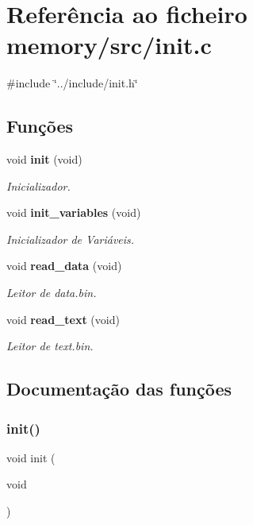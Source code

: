 \section{Referência ao ficheiro memory/src/init.c}
\label{init_8c}
{\ttfamily \#include \char`\"{}../include/init.\+h\char`\"{}}\newline
\subsection*{Funções}
\begin{DoxyCompactItemize}
\item 
void \textbf{ init} (void)
\begin{DoxyCompactList}\small\item\em Inicializador. \end{DoxyCompactList}\item 
void \textbf{ init\+\_\+variables} (void)
\begin{DoxyCompactList}\small\item\em Inicializador de Variáveis. \end{DoxyCompactList}\item 
void \textbf{ read\+\_\+data} (void)
\begin{DoxyCompactList}\small\item\em Leitor de data.\+bin. \end{DoxyCompactList}\item 
void \textbf{ read\+\_\+text} (void)
\begin{DoxyCompactList}\small\item\em Leitor de text.\+bin. \end{DoxyCompactList}\end{DoxyCompactItemize}


\subsection{Documentação das funções}
\mbox{\label{init_8c_a2858154e2009b0e6e616f313177762bc}} 
\subsubsection{init()}
{\footnotesize\ttfamily void init (\begin{DoxyParamCaption}\item[{void}]{ }\end{DoxyParamCaption})}




